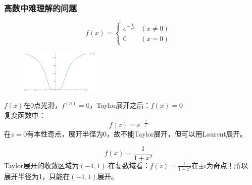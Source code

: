 \subsubsection{高数中难理解的问题}

\[
f(x) = \left\{
\begin{array}{lc}
e^{-\frac{1}{x^2}} & (x \neq 0)\\
0                  & (x = 0)     
\end{array}
\right.
\]

\begin{figure}
	\centering
	\includegraphics[width=3.95cm]{Figures/Exp[-x^-2].pdf}
\end{figure}

$f(x)$在0点光滑，$f^{(n)} = 0$，Taylor展开之后：$f(x) = 0$\\
复变函数中：
\[f(z)=e^{-\frac{1}{z^2}}\]
在$z = 0$有本性奇点，展开半径为0，故不能Taylor展开，但可以用Laurent展开。

\[f(x)=\frac{1}{1+x^2}\]
Taylor展开的收敛区域为$(-1,1)$.在复数域看：$f(z)=\frac{1}{1+z^2}$在$\pm i$为奇点！所以展开半径为1，只能在$(-1,1)$展开。




